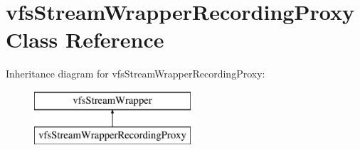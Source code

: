 \hypertarget{classorg_1_1bovigo_1_1vfs_1_1vfs_stream_wrapper_recording_proxy}{}\section{vfs\+Stream\+Wrapper\+Recording\+Proxy Class Reference}
\label{classorg_1_1bovigo_1_1vfs_1_1vfs_stream_wrapper_recording_proxy}
Inheritance diagram for vfs\+Stream\+Wrapper\+Recording\+Proxy\+:\begin{figure}[H]
\begin{center}
\leavevmode
\includegraphics[height=2.000000cm]{classorg_1_1bovigo_1_1vfs_1_1vfs_stream_wrapper_recording_proxy}
\end{center}
\end{figure}
